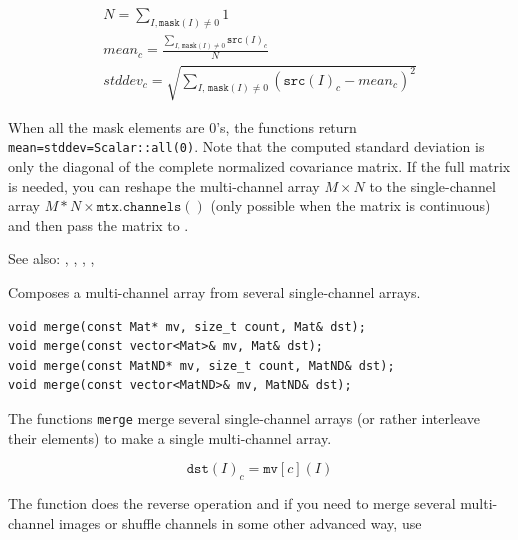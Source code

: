 \[
\begin{array}{l}
N = \sum_{I, \texttt{mask}(I) \ne 0} 1\\
mean_c = \frac{\sum_{ I, \, \texttt{mask}(I) \ne 0} \texttt{src}(I)_c}{N}\\
stddev_c = \sqrt{\sum_{ I, \, \texttt{mask}(I) \ne 0} (\texttt{src}(I)_c - mean_c)^2}
\end{array}
\]

When all the mask elements are 0's, the functions return \texttt{mean=stddev=Scalar::all(0)}.
Note that the computed standard deviation is only the diagonal of the complete normalized covariance matrix. If the full matrix is needed, you can reshape the multi-channel array $M \times N$ to the single-channel array $M*N \times \texttt{mtx.channels}()$ (only possible when the matrix is continuous) and then pass the matrix to .

See also: , , , , 


\label{merge}
Composes a multi-channel array from several single-channel arrays.

\begin{lstlisting}
void merge(const Mat* mv, size_t count, Mat& dst);
void merge(const vector<Mat>& mv, Mat& dst);
void merge(const MatND* mv, size_t count, MatND& dst);
void merge(const vector<MatND>& mv, MatND& dst);
\end{lstlisting}
\begin{description}
\end{description}
    
The functions \texttt{merge} merge several single-channel arrays (or rather interleave their elements) to make a single multi-channel array.

\[\texttt{dst}(I)_c = \texttt{mv}[c](I)\]

The function  does the reverse operation and if you need to merge several multi-channel images or shuffle channels in some other advanced way, use 

